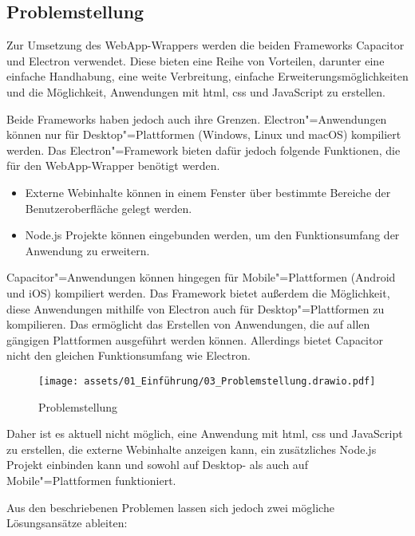\subsection{Problemstellung}

Zur Umsetzung des WebApp-Wrappers werden die beiden Frameworks Capacitor und Electron verwendet.
Diese bieten eine Reihe von Vorteilen, darunter eine einfache Handhabung, eine weite Verbreitung, einfache Erweiterungsmöglichkeiten und die Möglichkeit, Anwendungen mit \ac{html}, \ac{css} und JavaScript zu erstellen.
\cite{capacitor:docs, electron:docs}

Beide Frameworks haben jedoch auch ihre Grenzen.
Electron"=Anwendungen können nur für Desktop"=Plattformen (Windows, Linux und macOS) kompiliert werden.
Das Electron"=Framework bieten dafür jedoch folgende Funktionen, die für den WebApp-Wrapper benötigt werden.
\cite{electron:docs}

\begin{itemize}
  \setlength\itemsep{-0.5em}
  \item Externe Webinhalte können in einem Fenster über bestimmte Bereiche der Benutzeroberfläche gelegt werden.
  \item Node.js Projekte können eingebunden werden, um den Funktionsumfang der Anwendung zu erweitern.
\end{itemize}

Capacitor"=Anwendungen können hingegen für Mobile"=Plattformen (Android und iOS) kompiliert werden.
Das Framework bietet außerdem die Möglichkeit, diese Anwendungen mithilfe von Electron auch für Desktop"=Plattformen zu kompilieren.
Das ermöglicht das Erstellen von Anwendungen, die auf allen gängigen Plattformen ausgeführt werden können.
Allerdings bietet Capacitor nicht den gleichen Funktionsumfang wie Electron.
\cite{capacitor:docs, capacitor-electron}

\begin{figure}[H]
  \centering
  \texttt{[image: assets/01\_Einführung/03\_Problemstellung.drawio.pdf]}
  \caption{Problemstellung}
\end{figure}

Daher ist es aktuell nicht möglich, eine Anwendung mit \ac{html}, \ac{css} und JavaScript zu erstellen, die externe Webinhalte anzeigen kann, ein zusätzliches Node.js Projekt einbinden kann und sowohl auf Desktop- als auch auf Mobile"=Plattformen funktioniert.

Aus den beschriebenen Problemen lassen sich jedoch zwei mögliche Lösungsansätze ableiten:

